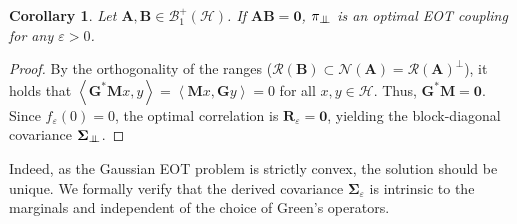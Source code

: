 \documentclass[noinfoline]{imsart}\setcounter{tocdepth}{2}
\newcommand{\m}[1]{\mathbf{#1}}
\renewcommand{\c}[1]{\mathcal{#1}}
\newcommand{\innpr}[2]{{\left\langle {#1},{#2}\right\rangle}}
\newcommand{\indep}{\perp\mkern-9.5mu\perp}
\theoremstyle{plain}
\newtheorem{corollary}[theorem]{Corollary}
\begin{document}
\begin{corollary}\label{cor:ortho:indep}
Let $\m{A}, \m{B} \in \c{B}_{1}^{+}(\c{H})$. If $\m{A} \m{B} = \m{0}$, $\pi_{\indep}$ is an optimal EOT coupling for any $\varepsilon > 0$.
\end{corollary}
\begin{proof}
By the orthogonality of the ranges ($\c{R}(\m{B}) \subset \c{N}(\m{A}) = \c{R}(\m{A})^\perp$), it holds that $\innpr{\m{G}^* \m{M} x}{y} = \innpr{\m{M} x}{\m{G} y} = 0$ for all $x, y \in \c{H}$. Thus, $\m{G}^* \m{M} = \m{0}$. Since $f_{\varepsilon}(0) = 0$, the optimal correlation is $\m{R}_{\varepsilon} = \m{0}$, yielding the block-diagonal covariance $\m{\Sigma}_{\indep}$.
\end{proof}

Indeed, as the Gaussian EOT problem is strictly convex, the solution should be unique. We formally verify that the derived covariance $\m{\Sigma}_{\varepsilon}$ is intrinsic to the marginals and independent of the choice of Green's operators.
\end{document}
